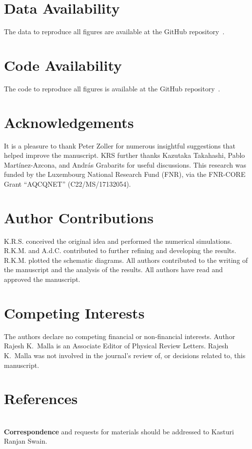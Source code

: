 \documentclass[10pt, superscriptaddress,aps,pra,twocolumn,showpacs,nofootinbib, longbibliography, notitlepage,floatfix]{revtex4-2}
\begin{document}
\section*{Data Availability}
The data to reproduce all figures are available at the GitHub repository~\cite{nafqa_kasturi}.

\section*{Code Availability}
The code to reproduce all figures is available at the GitHub repository~\cite{nafqa_kasturi}.

\section*{Acknowledgements}
It is a pleasure to thank Peter Zoller for numerous insightful suggestions that helped improve the manuscript. KRS further thanks Kazutaka Takahashi, Pablo Martínez-Azcona, and András Grabarits for useful discussions. This research was funded by the Luxembourg National Research Fund (FNR),  via the FNR-CORE Grant ``AQCQNET'' (C22/MS/17132054). 

\section*{Author Contributions}
K.R.S. conceived the original idea and performed the numerical simulations. R.K.M. and A.d.C. contributed to further refining and developing the results. R.K.M. plotted the schematic diagrams. All authors contributed to the writing of the manuscript and the analysis of the results. All authors have read and approved the manuscript.

\section*{Competing Interests}
The authors declare no competing financial or non-financial interests. Author Rajesh K.\ Malla is an Associate Editor of Physical Review Letters. Rajesh K.\ Malla was not involved in the journal’s review of, or decisions related to, this manuscript.

\section*{References} 

\\

\noindent \textbf{Correspondence} and requests for materials should be addressed to Kasturi Ranjan Swain.
\end{document}
